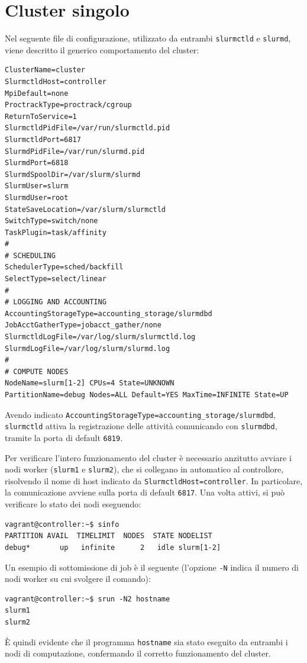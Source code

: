 \documentclass[12pt,a4paper,twoside,openright]{book}
\begin{document}
\section{Cluster singolo}
Nel seguente file di configurazione, utilizzato da entrambi \texttt{slurmctld} e \texttt{slurmd}, viene descritto il generico comportamento del cluster:
\begin{verbatim}
ClusterName=cluster
SlurmctldHost=controller
MpiDefault=none
ProctrackType=proctrack/cgroup
ReturnToService=1
SlurmctldPidFile=/var/run/slurmctld.pid
SlurmctldPort=6817
SlurmdPidFile=/var/run/slurmd.pid
SlurmdPort=6818
SlurmdSpoolDir=/var/slurm/slurmd
SlurmUser=slurm
SlurmdUser=root
StateSaveLocation=/var/slurm/slurmctld
SwitchType=switch/none
TaskPlugin=task/affinity
#
# SCHEDULING
SchedulerType=sched/backfill
SelectType=select/linear
#
# LOGGING AND ACCOUNTING
AccountingStorageType=accounting_storage/slurmdbd
JobAcctGatherType=jobacct_gather/none
SlurmctldLogFile=/var/log/slurm/slurmctld.log
SlurmdLogFile=/var/log/slurm/slurmd.log
#
# COMPUTE NODES
NodeName=slurm[1-2] CPUs=4 State=UNKNOWN
PartitionName=debug Nodes=ALL Default=YES MaxTime=INFINITE State=UP
\end{verbatim}
Avendo indicato \texttt{AccountingStorageType=accounting_storage/slurmdbd}, \texttt{slurmctld} attiva la registrazione delle attività comunicando con \texttt{slurmdbd}, tramite la porta di default \texttt{6819}.

Per verificare l'intero funzionamento del cluster è necessario anzitutto avviare i nodi worker (\texttt{slurm1} e \texttt{slurm2}), che si collegano in automatico al controllore, risolvendo il nome di host indicato da \texttt{SlurmctldHost=controller}. In particolare, la comunicazione avviene sulla porta di default \texttt{6817}. Una volta attivi, si può verificare lo stato dei nodi eseguendo:
\begin{verbatim}
vagrant@controller:~$ sinfo
PARTITION AVAIL  TIMELIMIT  NODES  STATE NODELIST
debug*       up   infinite      2   idle slurm[1-2]
\end{verbatim}
Un esempio di sottomissione di job è il seguente (l'opzione \texttt{-N} indica il numero di nodi worker su cui svolgere il comando):
\begin{verbatim}
vagrant@controller:~$ srun -N2 hostname
slurm1
slurm2
\end{verbatim}
È quindi evidente che il programma \texttt{hostname} sia stato eseguito da entrambi i nodi di computazione, confermando il corretto funzionamento del cluster.
\end{document}
